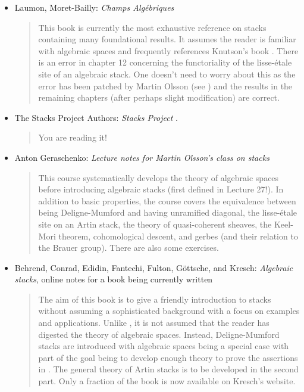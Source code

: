 \begin{itemize}
\item Laumon, Moret-Bailly: \emph{Champs Alg\'ebriques} \cite{LM-B}
\begin{quote}
This book is currently the most exhaustive reference on stacks containing
many foundational results. It assumes the reader is familiar with algebraic
spaces and frequently references Knutson's book \cite{Kn}. There is an
error in chapter 12 concerning the functoriality of the lisse-\'etale site of
an algebraic stack. One doesn't need to worry about this as the error has been
patched by Martin Olsson (see \cite{olsson_sheaves}) and the results in the
remaining chapters (after perhaps slight modification) are correct.
\end{quote}
\item The Stacks Project Authors: \emph{Stacks Project}
\cite{stacks-project}.
\begin{quote}
You are reading it!
\end{quote}
\item Anton Geraschenko:
\emph{Lecture notes for Martin Olsson's class on stacks} \cite{olsson_stacks}
\begin{quote}
This course systematically develops the theory of algebraic
spaces before introducing algebraic stacks (first defined in Lecture 27!). In
addition to basic properties, the course covers the equivalence between being
Deligne-Mumford and having unramified diagonal, the lisse-\'etale site on an
Artin stack, the theory of quasi-coherent sheaves, the Keel-Mori theorem,
cohomological descent, and gerbes (and their relation to the Brauer group).
There are also some exercises.
\end{quote}
\item
Behrend, Conrad, Edidin, Fantechi, Fulton, G\"ottsche, and Kresch:
\emph{Algebraic stacks}, online notes for a book being currently written
\cite{stacks_book}
\begin{quote}
The aim of this book is to give a friendly introduction to stacks without
assuming a sophisticated background with a focus on examples and applications.
Unlike \cite{LM-B}, it is not assumed that the reader has digested the theory of
algebraic spaces. Instead, Deligne-Mumford stacks are introduced with
algebraic spaces being a special case with part of the goal being to develop
enough theory to prove the assertions in \cite{DM}. The general
theory of Artin stacks is to be developed in the second part. Only a fraction
of the book is now available on Kresch's website.
\end{quote}
\end{itemize}


